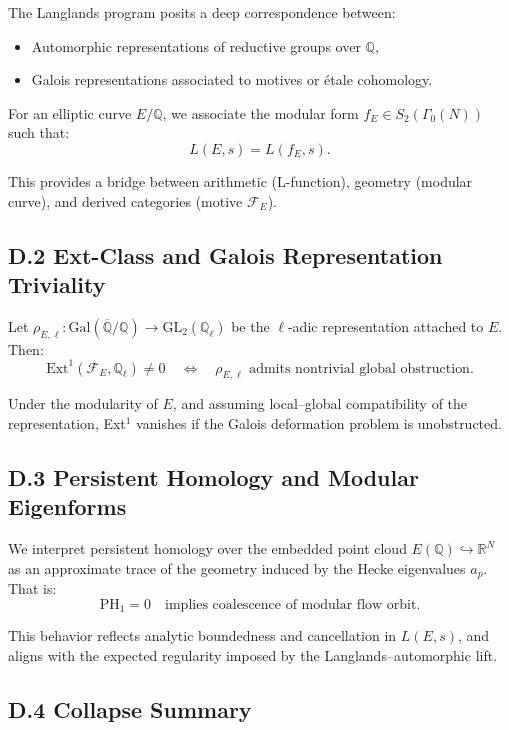 The Langlands program posits a deep correspondence between:
\begin{itemize}
  \item Automorphic representations of reductive groups over \( \mathbb{Q} \),
  \item Galois representations associated to motives or étale cohomology.
\end{itemize}

For an elliptic curve \( E/\mathbb{Q} \), we associate the modular form \( f_E \in S_2(\Gamma_0(N)) \) such that:
\[
L(E, s) = L(f_E, s).
\]

This provides a bridge between arithmetic (L-function), geometry (modular curve), and derived categories (motive \( \mathcal{F}_E \)).

\subsection*{D.2 Ext-Class and Galois Representation Triviality}

Let \( \rho_{E, \ell} : \mathrm{Gal}(\overline{\mathbb{Q}}/\mathbb{Q}) \to \mathrm{GL}_2(\mathbb{Q}_\ell) \) be the \(\ell\)-adic representation attached to \( E \).  
Then:
\[
\mathrm{Ext}^1(\mathcal{F}_E, \mathbb{Q}_\ell) \neq 0
\quad \Leftrightarrow \quad
\rho_{E,\ell} \text{ admits nontrivial global obstruction}.
\]

Under the modularity of \( E \), and assuming local–global compatibility of the representation, Ext$^1$ vanishes if the Galois deformation problem is unobstructed.

\subsection*{D.3 Persistent Homology and Modular Eigenforms}

We interpret persistent homology over the embedded point cloud \( E(\mathbb{Q}) \hookrightarrow \mathbb{R}^N \) as an approximate trace of the geometry induced by the Hecke eigenvalues \( a_p \).  
That is:
\[
\mathrm{PH}_1 = 0 \quad \text{implies coalescence of modular flow orbit}.
\]

This behavior reflects analytic boundedness and cancellation in \( L(E, s) \), and aligns with the expected regularity imposed by the Langlands–automorphic lift.

\subsection*{D.4 Collapse Summary}

